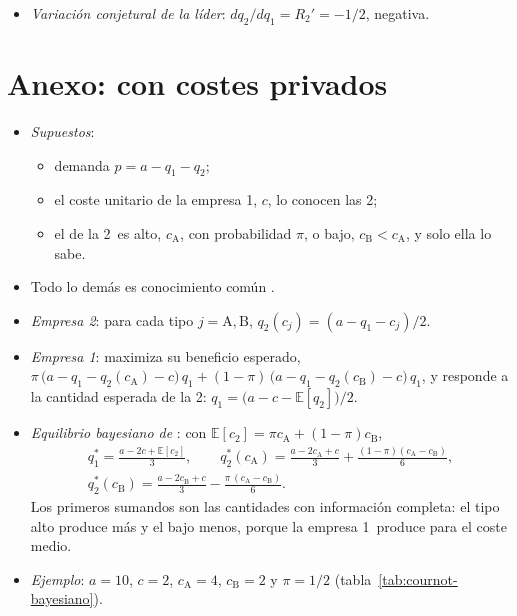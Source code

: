 \documentclass[11pt]{article}
\begin{document}
\begin{itemize}
\item \emph{Variación conjetural de la líder}: $dq_2/dq_1=R_2'=-1/2$, negativa.\findemo
\end{itemize}

\section{Anexo:  con costes privados}\label{anexo:cournot-bayesiano}

\begin{itemize}
\item \emph{Supuestos}\nocite{Gibbons1992Game}:
  \begin{itemize}
  \item demanda $p=a-q_1-q_2$;
  \item el coste unitario de la empresa 1, $c$, lo conocen las 2;
  \item el de la 2~es alto, $c_{\mathrm A}$, con probabilidad $\pi$, o bajo, $c_{\mathrm B}<c_{\mathrm A}$, y solo ella lo sabe.
  \end{itemize}
\item Todo lo demás es conocimiento común .
\item \emph{Empresa 2}: para cada tipo $j=\mathrm A,\mathrm B$, $q_2(c_j)=(a-q_1-c_j)/2$.
\item \emph{Empresa 1}: maximiza su beneficio esperado, $\pi\,\big(a-q_1-q_2(c_{\mathrm A})-c\big)\,q_1+(1-\pi)\,\big(a-q_1-q_2(c_{\mathrm B})-c\big)\,q_1$, y responde a la cantidad esperada de la 2: $q_1=\big(a-c-\mathbb{E}[q_2]\big)/2$.
\item \emph{Equilibrio bayesiano de }: con $\mathbb{E}[c_2]=\pi c_{\mathrm A}+(1-\pi)c_{\mathrm B}$,
  \[
  \begin{gathered}
  q_1^*=\frac{a-2c+\mathbb{E}[c_2]}{3},\qquad q_2^*(c_{\mathrm A})=\frac{a-2c_{\mathrm A}+c}{3}+\frac{(1-\pi)(c_{\mathrm A}-c_{\mathrm B})}{6},\\
  q_2^*(c_{\mathrm B})=\frac{a-2c_{\mathrm B}+c}{3}-\frac{\pi\,(c_{\mathrm A}-c_{\mathrm B})}{6}.
  \end{gathered}
  \]
  Los primeros sumandos son las cantidades con información completa: el tipo alto produce más y el bajo menos, porque la empresa 1~produce para el coste medio.
\item \emph{Ejemplo}: $a=10$, $c=2$, $c_{\mathrm A}=4$, $c_{\mathrm B}=2$ y $\pi=1/2$ (tabla~\ref{tab:cournot-bayesiano}).
\end{itemize}
\end{document}
